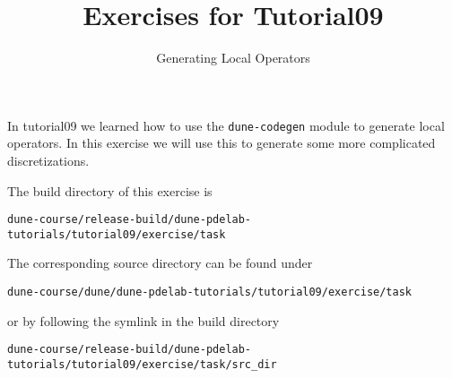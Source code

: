 \documentclass[12pt,a4paper]{article}
\title{\textbf{Exercises for Tutorial09}}
\subtitle{Generating Local Operators}
\begin{document}
\exerciseheader

In tutorial09 we learned how to use the \lstinline{dune-codegen} module to
generate local operators. In this exercise we will use this to generate some
more complicated discretizations.

The build directory of this exercise is
\begin{lstlisting}
dune-course/release-build/dune-pdelab-tutorials/tutorial09/exercise/task
\end{lstlisting}

The corresponding source directory can be found under
\begin{lstlisting}
dune-course/dune/dune-pdelab-tutorials/tutorial09/exercise/task
\end{lstlisting}
or by following the symlink in the build directory
\begin{lstlisting}
dune-course/release-build/dune-pdelab-tutorials/tutorial09/exercise/task/src_dir
\end{lstlisting}
\end{document}
